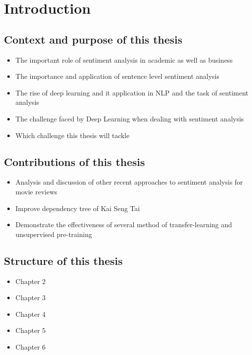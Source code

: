 \chapter{Introduction}
\section{Context and purpose of this thesis}
\begin{itemize}
\item The important role of sentiment analysis in academic as well as business
\item The importance and application of sentence level sentiment analysis
\item The rise of deep learning and it application in NLP and the task of sentiment analysis
\item The challenge faced by Deep Learning when dealing with sentiment analysis
\item Which challenge this thesis will tackle
\end{itemize}

\section{Contributions of this thesis}
\begin{itemize}
\item Analysis and discussion of other recent approaches to sentiment analysis for movie reviews 
\item Improve dependency tree of Kai Seng Tai
\item Demonstrate the effectiveness of several method of transfer-learning and unsupervised pre-training  
\end{itemize}

\section{Structure of this thesis}
\begin{itemize}
\item Chapter 2
\item Chapter 3
\item Chapter 4
\item Chapter 5
\item Chapter 6
\end{itemize}